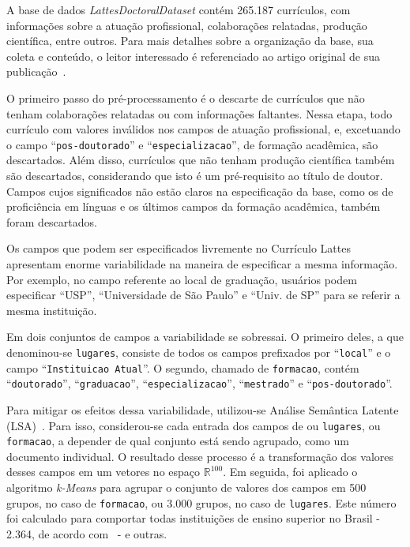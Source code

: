 \documentclass[12pt]{article}
\begin{document}
A base de dados \emph{LattesDoctoralDataset} contém 265.187 currículos, com informações sobre a atuação profissional, colaborações relatadas, produção científica, entre outros.
Para mais detalhes sobre a organização da base, sua coleta e conteúdo, o leitor interessado é referenciado ao artigo original de sua publicação~\cite{lattes-dataset}.

O primeiro passo do pré-processamento é o descarte de currículos que não tenham colaborações relatadas ou com informações faltantes.
Nessa etapa, todo currículo com valores inválidos nos campos de atuação profissional, e, excetuando o campo ``\texttt{pos-doutorado}'' e ``\texttt{especializacao}'', de formação acadêmica, são descartados.
Além disso, currículos que não tenham produção científica também são descartados, considerando que isto é um pré-requisito ao título de doutor.
Campos cujos significados não estão claros na especificação da base, como os de proficiência em línguas e os últimos campos da formação acadêmica, também foram descartados.

Os campos que podem ser especificados livremente no Currículo Lattes apresentam enorme variabilidade na maneira de especificar a mesma informação.
Por exemplo, no campo referente ao local de graduação, usuários podem especificar ``USP'', ``Universidade de São Paulo'' e ``Univ. de SP'' para se referir a mesma instituição.

Em dois conjuntos de campos a variabilidade se sobressai.
O primeiro deles, a que denominou-se \texttt{lugares}, consiste de todos os campos prefixados por ``\texttt{local}'' e o campo ``\texttt{Instituicao Atual}''.
O segundo, chamado de \texttt{formacao}, contém ``\texttt{doutorado}'', ``\texttt{graduacao}'', ``\texttt{especializacao}'', ``\texttt{mestrado}'' e ``\texttt{pos-doutorado}''.

Para mitigar os efeitos dessa variabilidade, utilizou-se Análise Semântica Latente (LSA)~\cite{lsa}.
Para isso, considerou-se cada entrada dos campos de ou \texttt{lugares}, ou \texttt{formacao}, a depender de qual conjunto está sendo agrupado, como um documento individual.
O resultado desse processo é a transformação dos valores desses campos em um vetores no espaço $\mathbb{R}^{100}$.
Em seguida, foi aplicado o algoritmo \emph{k-Means} para agrupar o conjunto de valores dos campos em 500 grupos, no caso de \texttt{formacao}, ou 3.000 grupos, no caso de \texttt{lugares}.
Este número foi calculado para comportar todas instituições de ensino superior no Brasil - 2.364, de acordo com~\cite{censo-mec} - e outras.
\end{document}
